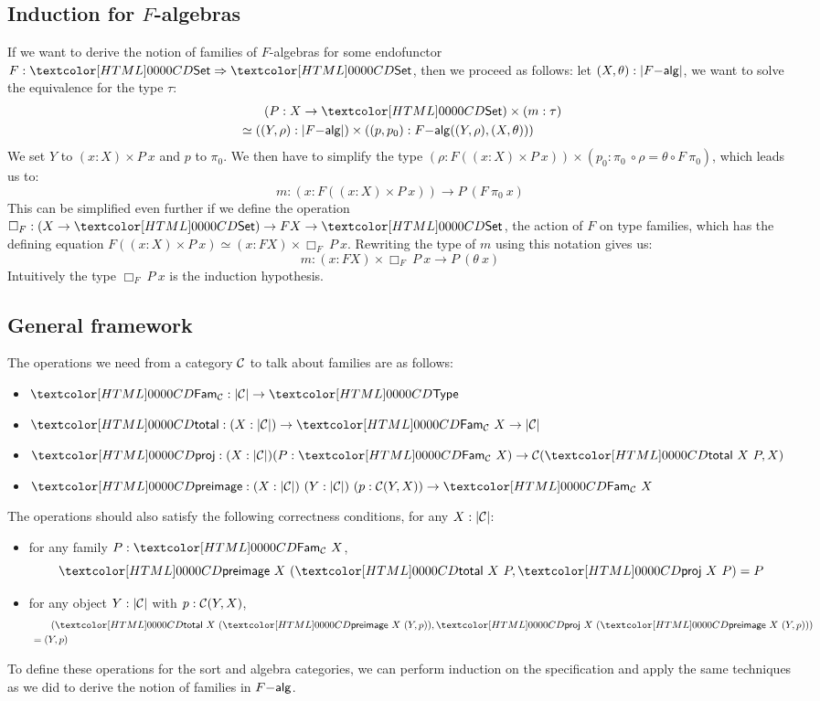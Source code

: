 \subsection{Induction for $F$-algebras}
If we want to derive the notion of families of $F$-algebras for some
endofunctor $F : \Func{\Set}{\Set}$, then we proceed as follows: let
$(X,\theta) : | F\mathsf{-alg} |$, we want to solve the equivalence for
the type $\tau$:
%
\begin{align*}
&\ \ \ \ \ \ (P : X \to \Set) \times (m : \tau) \\
&\simeq ((Y,\rho) : | \algcat{F} |) \times ((p,p_0) : \algcat{F}((Y,\rho),(X,\theta)))  
\end{align*}
%
We set $Y$ to $(x : X) \times P\ x$ and $p$ to $\pi_0$. We then have
to simplify the type
$(\rho : F ((x : X) \times P\ x)) \times (p_0 : \pi_0\ \circ \rho =
\theta \circ F\ \pi_0)$, which leads us to:
$$
m : (x : F ((x : X) \times P\ x)) \to P\ (F\ \pi_0\ x)
$$
This can be simplified even further if we define the operation
$\Box_F : (X \to \Set) \to FX \to \Set$, \ie the action of $F$ on type
families, which has the defining equation
$F ((x : X) \times P\ x) \simeq (x : FX) \times \Box_F\ P\
x$. Rewriting the type of $m$ using this notation gives us:
$$
m : (x : FX) \times \Box_F\ P\ x \to P\ (\theta\ x)
$$
Intuitively the type $\Box_F\ P\ x$ is the induction hypothesis.

\subsection{General framework}
The operations we need from a category $\mathcal{C}$ to talk about families
are as follows:
%
\begin{itemize}
\item $\Fam_{\Cc} : | \Cc | \to \Type$
\item $\total : (X : | \Cc |) \to \Fam_{\Cc}\ X \to | \Cc |$
\item $\proj : (X : | \Cc |) (P : \Fam_{\Cc}\ X) \to \Cc(\total\ X\ P, X)$
\item $\preimage : (X : | \Cc |)\ (Y : | \Cc |)\ (p : \Cc(Y,X)) \to \Fam_{\Cc}\ X$
\end{itemize}
%
The operations should also satisfy the following correctness conditions, for any $X : | \mathcal{C} |$:
%
\begin{itemize}
\item for any family $P : \Fam_{\Cc}\ X$, 
  $$\preimage\ X\ (\total\ X\ P , \proj\ X\ P) = P$$
\item for any object $Y : | \mathcal{C} |$ with $p : \mathcal{C}(Y,X)$,
  \begin{align*}
  &\ \ \ \ \ \ (\total\ X\ (\preimage\ X\ (Y,p)) , \proj\ X\ (\preimage\ X\ (Y,p))) \\
  &= (Y,p)
  \end{align*}
\end{itemize}
%
To define these operations for the sort and algebra categories, we can
perform induction on the specification and apply the same techniques
as we did to derive the notion of families in $F\mathsf{-alg}$.

